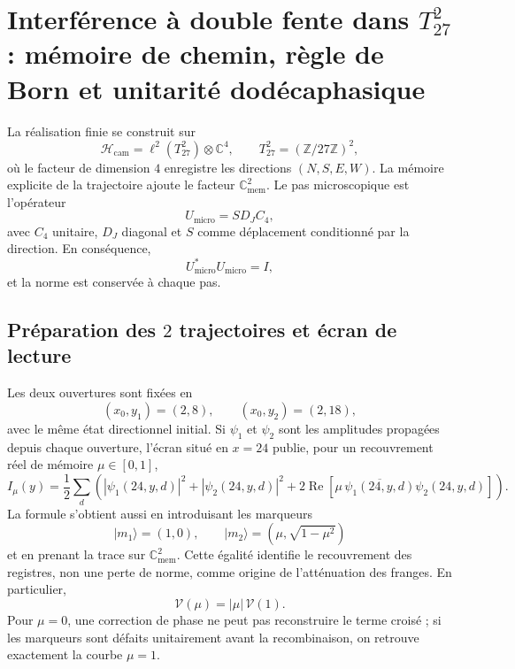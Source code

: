 \section{Interférence à double fente dans \(T^2_{27}\) : mémoire de chemin, règle de Born et unitarité dodécaphasique}
\label{sec:md-sucesora-interferometria-t27}

La réalisation finie se construit sur
\[
 \mathcal H_{\mathrm{cam}}
 =\ell^2\!\left(T_{27}^{2}\right)\otimes\mathbb C^4,
 \qquad
 T_{27}^{2}=(\mathbb Z/27\mathbb Z)^2,
\]
où le facteur de dimension \(4\) enregistre les directions
\((N,S,E,W)\). La mémoire explicite de la trajectoire ajoute le facteur
\(\mathbb C^2_{\mathrm{mem}}\). Le pas microscopique est l'opérateur
\begin{equation}
 U_{\mathrm{micro}}=S D_J C_4,
 \label{eq:md-sucesora-interferometro-microstep}
\end{equation}
avec \(C_4\) unitaire, \(D_J\) diagonal et \(S\) comme déplacement conditionné
par la direction. En conséquence,
\[
 U_{\mathrm{micro}}^*U_{\mathrm{micro}}=I,
\]
et la norme est conservée à chaque pas.

\subsection{Préparation des \(2\) trajectoires et écran de lecture}

Les deux ouvertures sont fixées en
\[
 (x_0,y_1)=(2,8),
 \qquad
 (x_0,y_2)=(2,18),
\]
avec le même état directionnel initial. Si \(\psi_1\) et \(\psi_2\) sont les
amplitudes propagées depuis chaque ouverture, l'écran situé en \(x=24\)
publie, pour un recouvrement réel de mémoire \(\mu\in[0,1]\),
\begin{equation}
 I_\mu(y)
 =\frac12\sum_d
 \left(
  |\psi_1(24,y,d)|^2+|\psi_2(24,y,d)|^2
  +2\operatorname{Re}\!\left[
   \mu\,\overline{\psi_1(24,y,d)}\psi_2(24,y,d)
  \right]
 \right).
 \label{eq:md-sucesora-interferometro-intensidad}
\end{equation}
La formule s'obtient aussi en introduisant les marqueurs
\[
 |m_1\rangle=(1,0),
 \qquad
 |m_2\rangle=(\mu,\sqrt{1-\mu^2})
\]
et en prenant la trace sur \(\mathbb C^2_{\mathrm{mem}}\). Cette égalité identifie le
recouvrement des registres, non une perte de norme, comme origine de
l'atténuation des franges. En particulier,
\begin{equation}
 \mathcal V(\mu)=|\mu|\,\mathcal V(1).
 \label{eq:md-sucesora-interferometro-visibilidad}
\end{equation}
Pour \(\mu=0\), une correction de phase ne peut pas reconstruire le terme croisé ;
si les marqueurs sont défaits unitairement avant la recombinaison, on
retrouve exactement la courbe \(\mu=1\).


